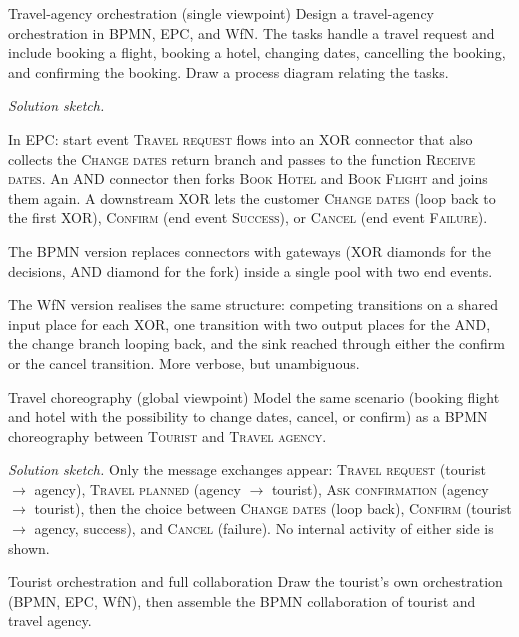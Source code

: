 \begin{examplebox}{Travel-agency orchestration (single viewpoint)}
Design a travel-agency orchestration in BPMN, EPC, and WfN. The tasks handle a travel request and include booking a flight, booking a hotel, changing dates, cancelling the booking, and confirming the booking. Draw a process diagram relating the tasks.
\end{examplebox}

\textit{Solution sketch.}

In EPC: start event \textsc{Travel request} flows into an XOR connector that also collects the \textsc{Change dates} return branch and passes to the function \textsc{Receive dates}. An AND connector then forks \textsc{Book Hotel} and \textsc{Book Flight} and joins them again. A downstream XOR lets the customer \textsc{Change dates} (loop back to the first XOR), \textsc{Confirm} (end event \textsc{Success}), or \textsc{Cancel} (end event \textsc{Failure}).

The BPMN version replaces connectors with gateways (XOR diamonds for the decisions, AND diamond for the fork) inside a single pool with two end events.

The WfN version realises the same structure: competing transitions on a shared input place for each XOR, one transition with two output places for the AND, the change branch looping back, and the sink reached through either the confirm or the cancel transition. More verbose, but unambiguous.

\begin{examplebox}{Travel choreography (global viewpoint)}
Model the same scenario (booking flight and hotel with the possibility to change dates, cancel, or confirm) as a BPMN choreography between \textsc{Tourist} and \textsc{Travel agency}.
\end{examplebox}

\textit{Solution sketch.} Only the message exchanges appear: \textsc{Travel request} (tourist $\to$ agency), \textsc{Travel planned} (agency $\to$ tourist), \textsc{Ask confirmation} (agency $\to$ tourist), then the choice between \textsc{Change dates} (loop back), \textsc{Confirm} (tourist $\to$ agency, success), and \textsc{Cancel} (failure). No internal activity of either side is shown.

\begin{examplebox}{Tourist orchestration and full collaboration}
Draw the tourist's own orchestration (BPMN, EPC, WfN), then assemble the BPMN collaboration of tourist and travel agency.
\end{examplebox}

